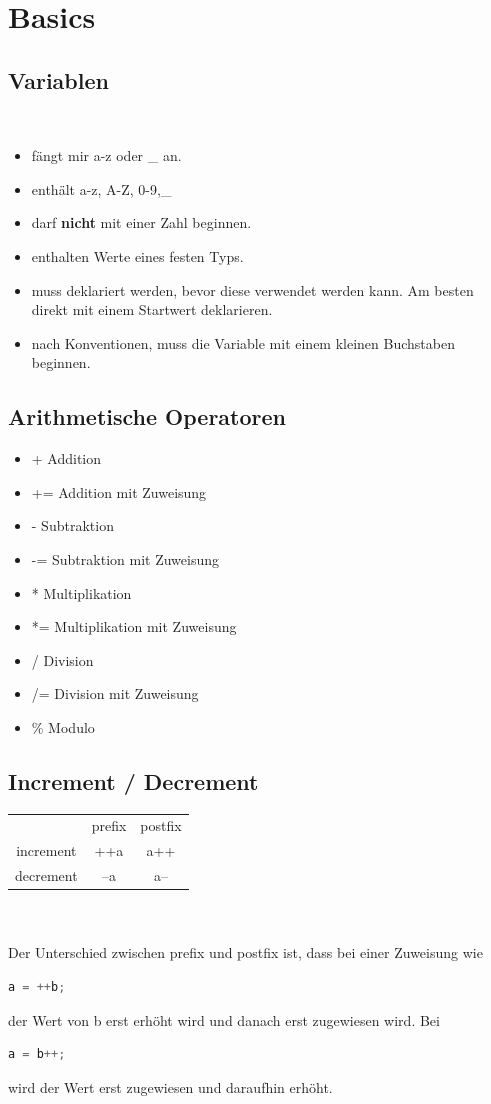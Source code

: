 \section{Basics}
\subsection{Variablen}\qquad\\
\begin{itemize}
	\item fängt mir a-z oder \_ an.
	\item enthält a-z, A-Z, 0-9,\_
	\item darf \textbf{nicht} mit einer Zahl beginnen. 
	\item enthalten Werte eines festen Typs.
	\item muss deklariert werden, bevor diese verwendet werden kann. Am besten direkt mit einem Startwert deklarieren.
	\item nach Konventionen, muss die Variable mit einem kleinen Buchstaben beginnen. 
\end{itemize}
\subsection{Arithmetische Operatoren}
\begin{itemize}
	\item + Addition
	\item += Addition mit Zuweisung
	\item - Subtraktion
	\item -= Subtraktion mit Zuweisung
	\item * Multiplikation
	\item *= Multiplikation mit Zuweisung
	\item / Division
	\item /= Division mit Zuweisung
	\item \% Modulo
\end{itemize}
\subsection{Increment / Decrement}
\begin{tabular}{ccc}
	& prefix & postfix \\ 
increment	& ++a & a++  \\ 
decrement	& --a & a-- \\ 
\end{tabular} \\\qquad \\
Der Unterschied zwischen prefix und postfix ist, dass bei einer Zuweisung wie
\begin{lstlisting}[language=C++] 
a = ++b;
\end{lstlisting}
der Wert von b erst erhöht wird und danach erst zugewiesen wird. Bei 
\begin{lstlisting}[language=C++] 
a = b++;
\end{lstlisting}
wird der Wert erst zugewiesen und daraufhin erhöht. 
